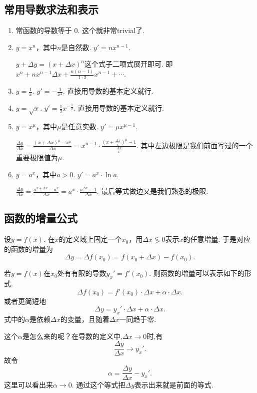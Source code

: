 \documentclass{article}
\begin{document}
\subsection{常用导数求法和表示}

\begin{enumerate}
	\item 常函数的导数等于{ \color{blue} $0$}. 这个就非常trivial了.
	\item $y=x^n$，其中$n$是自然数. {\color{blue} $y' = nx^{n-1}.$}

$y+\Delta y = (x+\Delta x)^n$这个式子二项式展开即可. 即$x^n + nx^{n-1}\Delta x + \frac{n(n-1)}{1 \cdot 2}x^{n-1}+ \cdots$.	
	
	\item $y=\frac{1}{x}$. {\color{blue} $y'=-\frac{1}{x^2}$}. 直接用导数的基本定义就行.
	\item $y=\sqrt{x}$. {\color{blue} $y' = \frac{1}{2}x^{-\frac{1}{2}}$.} 直接用导数的基本定义就行.
	\item $y=x^\mu$，其中$\mu$是任意实数. {\color{blue} $y' = \mu x^{\mu - 1}$.}
	
$\frac{\Delta y}{\Delta x} =  \frac{(x+\Delta x)^{\mu} - x^\mu}{\Delta x} =  x^{u-1} \cdot  \frac{(x+\frac{\Delta x}{x})^\mu - 1}{\frac{\Delta x}{x}}$. 其中左边极限是我们前面写过的一个重要极限值为$\mu$.	
	\item $y=a^x$，其中$a >0$. { \color{blue} $y' = a^x \cdot \ln a$.}
	
$\frac{\Delta y}{\Delta x} =\frac{a^{x + \Delta x} - a^x}{\Delta x} =  a^x \cdot \frac{a^{\Delta x} - 1}{\Delta x}$. 最后等式做边又是我们熟悉的极限.
\end{enumerate}

\newpage
\subsection{函数的增量公式}

设$y=f(x)$. 在$x$的定义域上固定一个$x_0$，用$\Delta x \lessgtr 0$表示$x$的任意增量. 于是对应的函数的增量为\[\Delta y = \Delta f(x_0) = f(x_0 + \Delta x) - f(x_0).\]

若$y=f(x)$在$x_0$处有有限的导数$y_x'=f'(x_0)$. 则函数的增量可以表示如下的形式.\[\Delta f(x_0) = f'(x_0) \cdot \Delta x + \alpha \cdot \Delta x.\]或者更简短地\[\Delta y = y_x' \cdot \Delta x + \alpha \cdot \Delta x.\]式中的$\alpha$是依赖$\Delta x$的变量，且随着$\Delta x$一同趋于零.

这个$\alpha$是怎么来的呢？在导数的定义中,$\Delta x \rightarrow 0$时,有\[\frac{\Delta y}{\Delta x} \rightarrow y_x'.\]故令\[\alpha = \frac{\Delta y}{\Delta x} - y_x'.\]这里可以看出来$\alpha \rightarrow 0$. 通过这个等式把$\Delta y$表示出来就是前面的等式. 
\end{document}
